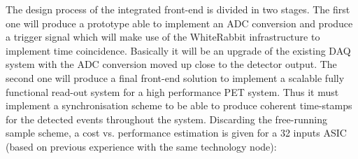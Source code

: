 The design process of the integrated front-end is divided in two stages. The first one will produce a prototype able to implement an ADC conversion and produce a trigger signal which will make use of the WhiteRabbit infrastructure to implement time coincidence. Basically it will be an upgrade of the existing DAQ system with the ADC conversion moved up close to the detector output. The second one will produce a final front-end solution to implement a scalable fully functional read-out system for a high performance PET system. Thus it must implement a synchronisation scheme to be able to produce coherent time-stamps for the detected events throughout the system. Discarding the free-running sample scheme, a cost vs. performance  estimation is given for a 32 inputs ASIC (based on previous experience with the same technology node):
 
% 
% 
 
